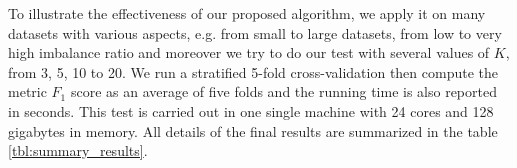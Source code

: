 To illustrate the effectiveness of our proposed algorithm, we apply it on many datasets with various aspects, e.g. from small to large datasets, from low to very high imbalance ratio and moreover we try to do our test with several values of $K$, from 3, 5, 10 to 20. We run a stratified 5-fold cross-validation then compute the metric $F_1$ score as an average of five folds and the running time is also reported in seconds. This test is carried out in one single machine with 24 cores and 128 gigabytes in memory. All details of the final results are summarized in the table \ref{tbl:summary_results}. 



